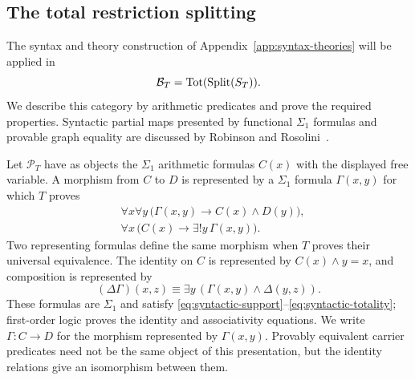 \subsection{The total restriction splitting}
\label{subsec:syntactic-total-splitting}

The syntax and theory construction of Appendix~\ref{app:syntax-theories}
will be applied in
\[
 \mathcal B_T=\operatorname{Tot}(\operatorname{Split}(S_T)).
\]
We describe this category by arithmetic predicates and prove the
required properties. Syntactic partial maps presented by functional
$\Sigma_1$ formulas and provable graph equality are discussed by
Robinson and Rosolini~\cite[pp.~108--109]{RobinsonRosolini}.

Let $\mathcal P_T$ have as objects the $\Sigma_1$ arithmetic formulas
$C(x)$ with the displayed free variable. A morphism from $C$ to $D$
is represented by a $\Sigma_1$ formula $\Gamma(x,y)$ for which $T$
proves
\begin{align}
 &\forall x\forall y\,
   \bigl(\Gamma(x,y)\longrightarrow C(x)\land D(y)\bigr),
                                               \label{eq:syntactic-support}\\
 &\forall x\,
   \bigl(C(x)\longrightarrow\exists!y\,\Gamma(x,y)\bigr).
                                               \label{eq:syntactic-totality}
\end{align}
Two representing formulas define the same morphism when $T$ proves
their universal equivalence. The identity on $C$ is represented by
$C(x)\land y=x$, and composition is represented by
\[
 (\Delta\Gamma)(x,z)
   \equiv\exists y\,(\Gamma(x,y)\land\Delta(y,z)).
\]
These formulas are $\Sigma_1$ and satisfy
\eqref{eq:syntactic-support}--\eqref{eq:syntactic-totality}; first-order
logic proves the identity and associativity equations. We write
$\Gamma:C\to D$ for the morphism represented by $\Gamma(x,y)$.
Provably equivalent carrier predicates need not be the same object
of this presentation, but the identity relations give an isomorphism
between them.

